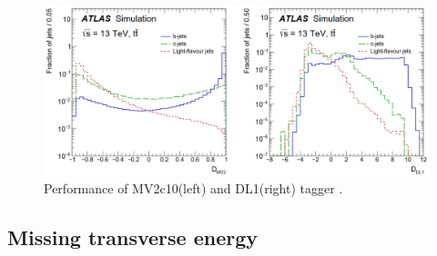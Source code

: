 \documentclass[letterpaper,12pt]{article}
\begin{document}
\begin{figure}[!h]
\includegraphics[width=1\textwidth]{MV2_DL1.png}
\caption{Performance of MV2c10(left) and DL1(right) tagger \cite{FTAG-2018-01}.}\label{fig:MV2_DL1}
\end{figure}











\subsection{Missing transverse energy}
\end{document}
